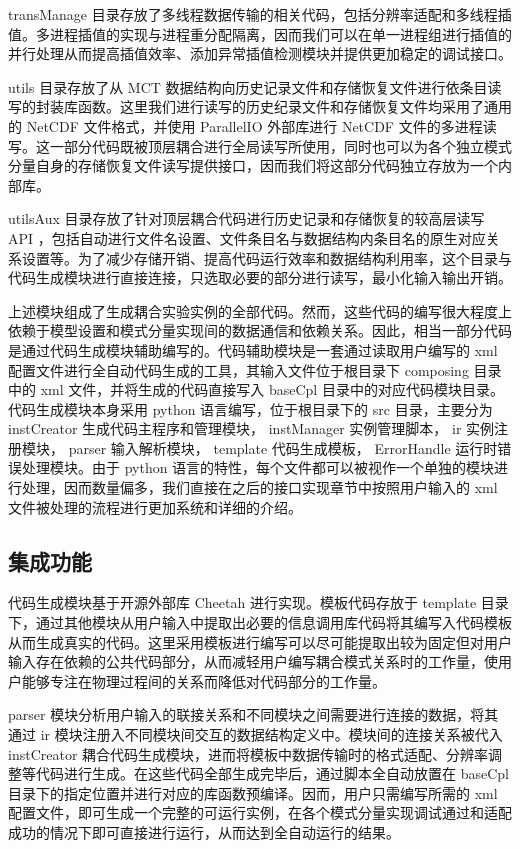 transManage 目录存放了多线程数据传输的相关代码，包括分辨率适配和多线程插值。多进程插值的实现与进程重分配隔离，因而我们可以在单一进程组进行插值的并行处理从而提高插值效率、添加异常插值检测模块并提供更加稳定的调试接口。

utils 目录存放了从 MCT 数据结构向历史记录文件和存储恢复文件进行依条目读写的封装库函数。这里我们进行读写的历史纪录文件和存储恢复文件均采用了通用的 NetCDF 文件格式，并使用 ParallelIO 外部库进行 NetCDF 文件的多进程读写。这一部分代码既被顶层耦合进行全局读写所使用，同时也可以为各个独立模式分量自身的存储恢复文件读写提供接口，因而我们将这部分代码独立存放为一个内部库。

utilsAux 目录存放了针对顶层耦合代码进行历史记录和存储恢复的较高层读写 API ，包括自动进行文件名设置、文件条目名与数据结构内条目名的原生对应关系设置等。为了减少存储开销、提高代码运行效率和数据结构利用率，这个目录与代码生成模块进行直接连接，只选取必要的部分进行读写，最小化输入输出开销。

上述模块组成了生成耦合实验实例的全部代码。然而，这些代码的编写很大程度上依赖于模型设置和模式分量实现间的数据通信和依赖关系。因此，相当一部分代码是通过代码生成模块辅助编写的。代码辅助模块是一套通过读取用户编写的 xml 配置文件进行全自动代码生成的工具，其输入文件位于根目录下 composing 目录中的 xml 文件，并将生成的代码直接写入 baseCpl 目录中的对应代码模块目录。代码生成模块本身采用 python 语言编写，位于根目录下的 src 目录，主要分为 instCreator 生成代码主程序和管理模块， instManager 实例管理脚本， ir 实例注册模块， parser 输入解析模块， template 代码生成模板， ErrorHandle 运行时错误处理模块。由于 python 语言的特性，每个文件都可以被视作一个单独的模块进行处理，因而数量偏多，我们直接在之后的接口实现章节中按照用户输入的 xml 文件被处理的流程进行更加系统和详细的介绍。

\subsection{集成功能}

代码生成模块基于开源外部库 Cheetah 进行实现。模板代码存放于 template 目录下，通过其他模块从用户输入中提取出必要的信息调用库代码将其编写入代码模板从而生成真实的代码。这里采用模板进行编写可以尽可能提取出较为固定但对用户输入存在依赖的公共代码部分，从而减轻用户编写耦合模式关系时的工作量，使用户能够专注在物理过程间的关系而降低对代码部分的工作量。

parser 模块分析用户输入的联接关系和不同模块之间需要进行连接的数据，将其通过 ir 模块注册入不同模块间交互的数据结构定义中。模块间的连接关系被代入 instCreator 耦合代码生成模块，进而将模板中数据传输时的格式适配、分辨率调整等代码进行生成。在这些代码全部生成完毕后，通过脚本全自动放置在 baseCpl 目录下的指定位置并进行对应的库函数预编译。因而，用户只需编写所需的 xml 配置文件，即可生成一个完整的可运行实例，在各个模式分量实现调试通过和适配成功的情况下即可直接进行运行，从而达到全自动运行的结果。

